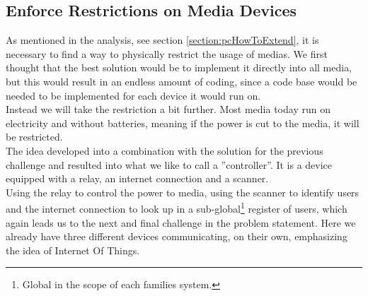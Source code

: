 \subsection{Enforce Restrictions on Media Devices}
As mentioned in the analysis, see section \ref{section:pcHowToExtend}, it is necessary to find a way to physically restrict the usage of medias. We first thought that the best solution would be to implement it directly into all media, but this would result in an endless amount of coding, since a code base would be needed to be implemented for each device it would run on.\\
Instead we will take the restriction a bit further. Most media today run on electricity and without batteries, meaning if the power is cut to the media, it will be restricted.\\
The idea developed into a combination with the solution for the previous challenge and resulted into what we like to call a ''controller''. It is a device equipped with a relay, an internet connection and a scanner.\\
Using the relay to control the power to media, using the scanner to identify users and the internet connection to look up in a sub-global\footnote{Global in the scope of each families system.} register of users, which again leads us to the next and final challenge in the problem statement. Here we already have three different devices communicating, on their own, emphasizing the idea of Internet Of Things.


